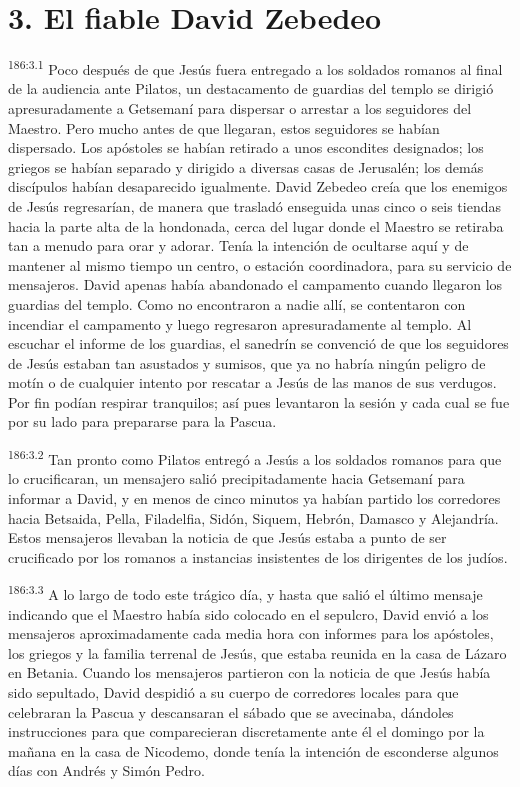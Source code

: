 \section*{3. El fiable David Zebedeo}
\par 
\textsuperscript{186:3.1} Poco después de que Jesús fuera entregado a los soldados romanos al final de la audiencia ante Pilatos, un destacamento de guardias del templo se dirigió apresuradamente a Getsemaní para dispersar o arrestar a los seguidores del Maestro. Pero mucho antes de que llegaran, estos seguidores se habían dispersado. Los apóstoles se habían retirado a unos escondites designados; los griegos se habían separado y dirigido a diversas casas de Jerusalén; los demás discípulos habían desaparecido igualmente. David Zebedeo creía que los enemigos de Jesús regresarían, de manera que trasladó enseguida unas cinco o seis tiendas hacia la parte alta de la hondonada, cerca del lugar donde el Maestro se retiraba tan a menudo para orar y adorar. Tenía la intención de ocultarse aquí y de mantener al mismo tiempo un centro, o estación coordinadora, para su servicio de mensajeros. David apenas había abandonado el campamento cuando llegaron los guardias del templo. Como no encontraron a nadie allí, se contentaron con incendiar el campamento y luego regresaron apresuradamente al templo. Al escuchar el informe de los guardias, el sanedrín se convenció de que los seguidores de Jesús estaban tan asustados y sumisos, que ya no habría ningún peligro de motín o de cualquier intento por rescatar a Jesús de las manos de sus verdugos. Por fin podían respirar tranquilos; así pues levantaron la sesión y cada cual se fue por su lado para prepararse para la Pascua.

\par 
\textsuperscript{186:3.2} Tan pronto como Pilatos entregó a Jesús a los soldados romanos para que lo crucificaran, un mensajero salió precipitadamente hacia Getsemaní para informar a David, y en menos de cinco minutos ya habían partido los corredores hacia Betsaida, Pella, Filadelfia, Sidón, Siquem, Hebrón, Damasco y Alejandría. Estos mensajeros llevaban la noticia de que Jesús estaba a punto de ser crucificado por los romanos a instancias insistentes de los dirigentes de los judíos.

\par 
\textsuperscript{186:3.3} A lo largo de todo este trágico día, y hasta que salió el último mensaje indicando que el Maestro había sido colocado en el sepulcro, David envió a los mensajeros aproximadamente cada media hora con informes para los apóstoles, los griegos y la familia terrenal de Jesús, que estaba reunida en la casa de Lázaro en Betania. Cuando los mensajeros partieron con la noticia de que Jesús había sido sepultado, David despidió a su cuerpo de corredores locales para que celebraran la Pascua y descansaran el sábado que se avecinaba, dándoles instrucciones para que comparecieran discretamente ante él el domingo por la mañana en la casa de Nicodemo, donde tenía la intención de esconderse algunos días con Andrés y Simón Pedro.

